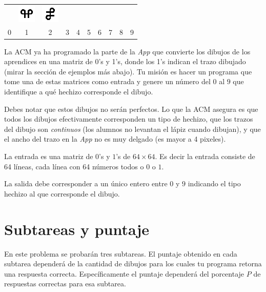 \documentclass{oci}
\begin{document}
\begin{problemDescription}
\begin{center}
\begin{tabular}{cccccccccc}
\begin{minipage}[b]{32pt}
\begin{center}
\end{center} \end{minipage} &
\includegraphics{imgs/figA08.png} &
\includegraphics{imgs/figA09.png} \\
0 & 1 & 2 & 3 & 4 & 5 & 6 & 7 & 8  & 9
\end{tabular}
\end{center}

La ACM ya ha programado la parte de la \emph{App} que convierte los dibujos de
los aprendices en una matriz de 0's y 1's, donde los 1's indican el trazo
dibujado (mirar la sección de ejemplos más abajo).
Tu misión es hacer un programa que tome una de estas matrices como entrada y
genere un número del $0$ al $9$ que identifique a qué hechizo corresponde el
dibujo.

Debes notar que estos dibujos no serán perfectos. 
Lo que la ACM asegura es que todos los dibujos efectivamente corresponden un
tipo de hechizo, que los trazos del dibujo son \emph{continuos} (los alumnos no
levantan el lápiz cuando dibujan), y que el ancho del trazo en la \emph{App} no
es muy delgado (es mayor a 4 pixeles).
\end{problemDescription}

\begin{inputDescription}
La entrada es una matriz de $0$'s y $1$'s de $64\times 64$. Es decir la entrada
consiste de 64 líneas, cada línea con 64 números todos o $0$ o $1$.
\end{inputDescription}

\begin{outputDescription}
La salida debe corresponder a un único entero entre $0$ y $9$ indicando el tipo
hechizo al que corresponde el dibujo.
\end{outputDescription}

\section*{Subtareas y puntaje}
En este problema se probarán tres subtareas.
El puntaje obtenido en cada subtarea dependerá de la cantidad de dibujos para
los cuales tu programa retorna una respuesta correcta.
Específicamente el puntaje dependerá del porcentaje $P$ de respuestas correctas
para esa subtarea.
\end{document}
